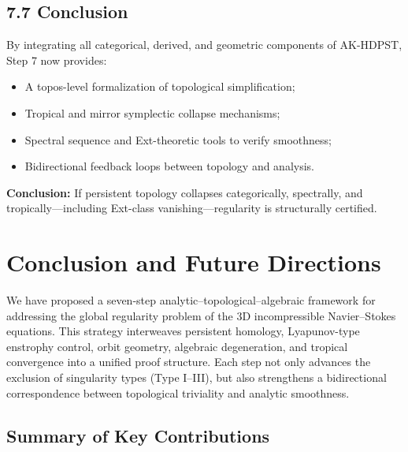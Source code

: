 \documentclass[11pt]{article}
\theoremstyle{definition}
\begin{document}
\subsection*{7.7 Conclusion}

By integrating all categorical, derived, and geometric components of AK-HDPST, Step 7 now provides:
\begin{itemize}
  \item A topos-level formalization of topological simplification;
  \item Tropical and mirror symplectic collapse mechanisms;
  \item Spectral sequence and Ext-theoretic tools to verify smoothness;
  \item Bidirectional feedback loops between topology and analysis.
\end{itemize}
\textbf{Conclusion:} If persistent topology collapses categorically, spectrally, and tropically---including Ext-class vanishing---regularity is structurally certified.




\section{Conclusion and Future Directions}

We have proposed a seven-step analytic–topological–algebraic framework for addressing the global regularity problem of the 3D incompressible Navier–Stokes equations. This strategy interweaves persistent homology, Lyapunov-type enstrophy control, orbit geometry, algebraic degeneration, and tropical convergence into a unified proof structure. Each step not only advances the exclusion of singularity types (Type I–III), but also strengthens a bidirectional correspondence between topological triviality and analytic smoothness.

\subsection*{Summary of Key Contributions}
\end{document}
